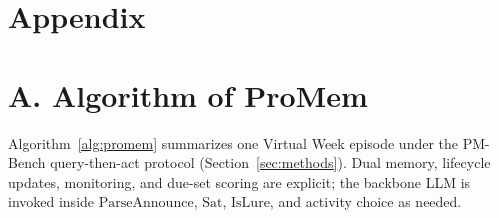\section*{Appendix}
\renewcommand{\thesubsection}{\thesection.\arabic{subsection}}

\section{A. Algorithm of ProMem}
\label{sec:Algorithm}

Algorithm~\ref{alg:promem} summarizes one Virtual Week episode under the PM-Bench query-then-act protocol (Section~\ref{sec:methods}). Dual memory, lifecycle updates, monitoring, and due-set scoring are explicit; the backbone LLM is invoked inside $\mathrm{ParseAnnounce}$, $\mathrm{Sat}$, $\mathrm{IsLure}$, and activity choice as needed.

